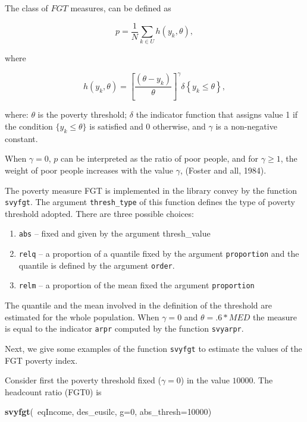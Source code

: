 \documentclass[]{book}
\newenvironment{Shaded}{\begin{snugshade}}{\end{snugshade}}
\newcommand{\KeywordTok}[1]{\textcolor[rgb]{0.13,0.29,0.53}{\textbf{{#1}}}}
\newcommand{\DataTypeTok}[1]{\textcolor[rgb]{0.13,0.29,0.53}{{#1}}}
\newcommand{\DecValTok}[1]{\textcolor[rgb]{0.00,0.00,0.81}{{#1}}}
\newcommand{\NormalTok}[1]{{#1}}
\providecommand{\tightlist}{%
  \setlength{\itemsep}{0pt}\setlength{\parskip}{0pt}}
\begin{document}
The class of \(FGT\) measures, can be defined as

\[
p=\frac{1}{N}\sum_{k\in U}h(y_{k},\theta ), 
\]

where

\[
h(y_{k},\theta )=\left[ \frac{(\theta -y_{k})}{\theta }\right] ^{\gamma
}\delta \left\{ y_{k}\leq \theta \right\} , 
\]

where: \(\theta\) is the poverty threshold; \(\delta\) the indicator
function that assigns value 1 if the condition \(\{y_{k}\leq \theta \}\)
is satisfied and 0 otherwise, and \(\gamma\) is a non-negative constant.

When \(\gamma =0\), \(p\) can be interpreted as the ratio of poor
people, and for \(\gamma \geq 1\), the weight of poor people increases
with the value \(\gamma\), (Foster and all, 1984).

The poverty measure FGT is implemented in the library convey by the
function \texttt{svyfgt}. The argument \texttt{thresh\_type} of this
function defines the type of poverty threshold adopted. There are three
possible choices:

\begin{enumerate}
\def\labelenumi{\arabic{enumi}.}
\tightlist
\item
  \texttt{abs} -- fixed and given by the argument thresh\_value
\item
  \texttt{relq} -- a proportion of a quantile fixed by the argument
  \texttt{proportion} and the quantile is defined by the argument
  \texttt{order}.
\item
  \texttt{relm} -- a proportion of the mean fixed the argument
  \texttt{proportion}
\end{enumerate}

The quantile and the mean involved in the definition of the threshold
are estimated for the whole population. When \(\gamma=0\) and
\(\theta= .6*MED\) the measure is equal to the indicator \texttt{arpr}
computed by the function \texttt{svyarpr}.

Next, we give some examples of the function \texttt{svyfgt} to estimate
the values of the FGT poverty index.

Consider first the poverty threshold fixed (\(\gamma=0\)) in the value
\(10000\). The headcount ratio (FGT0) is

\begin{Shaded}
\begin{Highlighting}[]
\KeywordTok{svyfgt}\NormalTok{(~eqIncome, des_eusilc, }\DataTypeTok{g=}\DecValTok{0}\NormalTok{, }\DataTypeTok{abs_thresh=}\DecValTok{10000}\NormalTok{)}
\end{Highlighting}
\end{Shaded}
\end{document}
